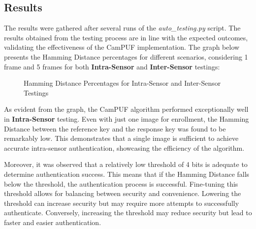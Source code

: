 \subsection{Results}
The results were gathered after several runs of the \emph{auto\_testing.py} script. The results obtained from the testing process are in line with the expected outcomes, validating the effectiveness of the CamPUF implementation. The graph below presents the Hamming Distance percentages for different scenarios, considering 1 frame and 5 frames for both \textbf{Intra-Sensor} and \textbf{Inter-Sensor} testings:

\begin{figure}[h!]
	\centering
	\caption{Hamming Distance Percentages for Intra-Sensor and Inter-Sensor Testings}
	\label{fig:results_graph}
\end{figure}

As evident from the graph, the CamPUF algorithm performed exceptionally well in \textbf{Intra-Sensor} testing. Even with just one image for enrollment, the Hamming Distance between the reference key and the response key was found to be remarkably low. This demonstrates that a single image is sufficient to achieve accurate intra-sensor authentication, showcasing the efficiency of the algorithm.

Moreover, it was observed that a relatively low threshold of 4 bits is adequate to determine authentication success. This means that if the Hamming Distance falls below the threshold, the authentication process is successful. Fine-tuning this threshold allows for balancing between security and convenience. Lowering the threshold can increase security but may require more attempts to successfully authenticate. Conversely, increasing the threshold may reduce security but lead to faster and easier authentication.

